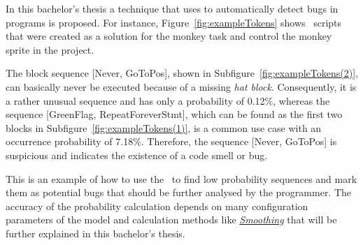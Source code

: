 In this bachelor's thesis a technique that uses  to automatically detect bugs in \scratch{} programs is proposed. For instance, Figure~\ref{fig:exampleTokens} shows \scratch\ scripts that were created as a solution for the monkey task and control the monkey sprite in the project. 

The block sequence [Never, GoToPos], shown in Subfigure~\ref{fig:exampleTokens(2)}, can basically never be executed because of a missing \textit{hat block}. Consequently, it is a rather unusual sequence and has only a probability of 0.12\%, whereas the sequence [GreenFlag, RepeatForeverStmt], which can be found as the first two blocks in Subfigure~\ref{fig:exampleTokens(1)}, is a common use case with an occurrence probability of 7.18\%. Therefore, the sequence [Never, GoToPos] is suspicious and indicates the existence of a code smell or bug. 

This is an example of how to use the \ngram\ to find low probability sequences and mark them as potential bugs that should be further analysed by the programmer. The accuracy of the probability calculation depends on many configuration parameters of the model and calculation methods like \hyperref[def:smoothing]{\textit{Smoothing}} that will be further explained in this bachelor's thesis. 
